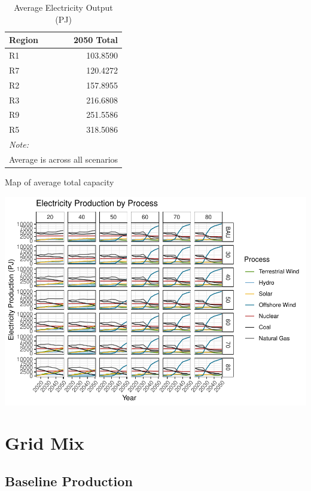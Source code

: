 \documentclass[]{article}
\begin{document}
\begin{table}[!h]

\caption{\label{tab:unnamed-chunk-3}Average Electricity Output (PJ)}
\centering
\begin{tabular}{lr}
\toprule
Region & 2050 Total\\
\midrule
\rowcolor{gray!6}  R1 & 103.8590\\
R7 & 120.4272\\
\rowcolor{gray!6}  R2 & 157.8955\\
R3 & 216.6808\\
\rowcolor{gray!6}  R9 & 251.5586\\
R5 & 318.5086\\
\bottomrule
\multicolumn{2}{l}{\textit{Note: }}\\
\multicolumn{2}{l}{Average is across all scenarios}\\
\end{tabular}
\end{table}

Map of average total capacity

\includegraphics{osw_Report_files/figure-latex/unnamed-chunk-19-1.pdf}

\hypertarget{grid-mix}{%
\section{Grid Mix}\label{grid-mix}}

\hypertarget{baseline-production}{%
\subsection{Baseline Production}\label{baseline-production}}
\end{document}
